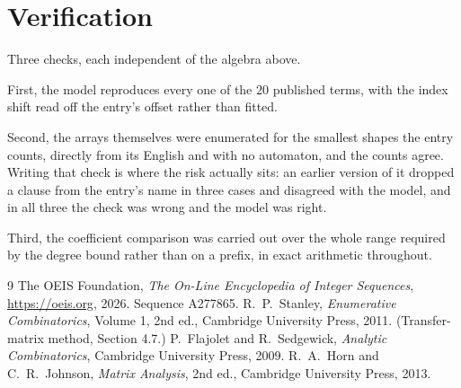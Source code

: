 \documentclass[11pt,a4paper]{article}
\theoremstyle{plain}
\theoremstyle{definition}
\begin{document}
\section{Verification}

Three checks, each independent of the algebra above.

First, the model reproduces every one of the $20$ published terms, with the index shift
read off the entry's offset rather than fitted.

Second, the arrays themselves were enumerated for the smallest shapes the entry counts,
directly from its English and with no automaton, and the counts agree. Writing that check is
where the risk actually sits: an earlier version of it dropped a clause from the entry's name
in three cases and disagreed with the model, and in all three the check was wrong and the model
was right.

Third, the coefficient comparison was carried out over the whole range required by the degree
bound rather than on a prefix, in exact arithmetic throughout.

\begin{thebibliography}{9}
 The OEIS Foundation, \emph{The On-Line Encyclopedia of Integer
Sequences}, \url{https://oeis.org}, 2026. Sequence A277865.
 R.~P.~Stanley, \emph{Enumerative Combinatorics}, Volume 1, 2nd ed.,
Cambridge University Press, 2011. (Transfer-matrix method, Section 4.7.)
 P.~Flajolet and R.~Sedgewick, \emph{Analytic Combinatorics}, Cambridge
University Press, 2009.
 R.~A.~Horn and C.~R.~Johnson, \emph{Matrix Analysis}, 2nd ed., Cambridge
University Press, 2013.
\end{thebibliography}
\end{document}
